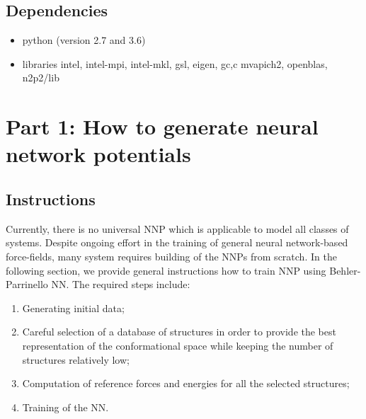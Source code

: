 \documentclass[12pt]{article}
\begin{document}
\subsection{Dependencies}
\begin{itemize}
    \item python (version 2.7 and 3.6)
    \item libraries intel, intel-mpi, intel-mkl, gsl, eigen, gc,c mvapich2, openblas, n2p2/lib
\end{itemize}
%
%
%
%
\newpage
%
\section{Part 1: How to generate neural network potentials}
\subsection*{Instructions}

Currently, there is no universal NNP which is applicable to model all classes of systems. Despite ongoing effort in the training of general neural network-based force-fields, many system requires building of the NNPs from scratch. In the following section, we provide general instructions how to train NNP using Behler-Parrinello NN. The required steps include: 

\begin{enumerate}
    \item Generating initial data;
    \item Careful selection of a database of structures in order to provide the best representation of the conformational space while keeping the number of structures relatively low;
    \item Computation of reference forces and energies for all the selected structures;
    \item Training of the NN.
\end{enumerate}
%
\end{document}
